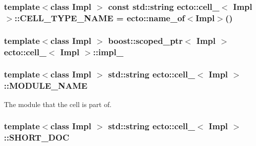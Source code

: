 \hypertarget{structecto_1_1cell___a26e158738e4e4c8f0ddb64efce30d8d3}{
\subsubsection[{C\-E\-L\-L\-\_\-\-T\-Y\-P\-E\-\_\-\-N\-A\-M\-E}]{\setlength{\rightskip}{0pt plus 5cm}template$<$class Impl $>$ const std\-::string {\bf ecto\-::cell\-\_\-}$<$ Impl $>$\-::C\-E\-L\-L\-\_\-\-T\-Y\-P\-E\-\_\-\-N\-A\-M\-E = {\bf ecto\-::name\-\_\-of}$<$Impl$>$()\hspace{0.3cm}{\ttfamily [static]}}}\label{structecto_1_1cell___a26e158738e4e4c8f0ddb64efce30d8d3}
\hypertarget{structecto_1_1cell___aefbb595c18abd0479e06a6f879dac961}{
\subsubsection[{impl\-\_\-}]{\setlength{\rightskip}{0pt plus 5cm}template$<$class Impl $>$ boost\-::scoped\-\_\-ptr$<$ Impl $>$ {\bf ecto\-::cell\-\_\-}$<$ Impl $>$\-::impl\-\_\-\hspace{0.3cm}{\ttfamily [private]}}}\label{structecto_1_1cell___aefbb595c18abd0479e06a6f879dac961}
\hypertarget{structecto_1_1cell___ab81cf6649132223f620b739a57db04db}{
\subsubsection[{M\-O\-D\-U\-L\-E\-\_\-\-N\-A\-M\-E}]{\setlength{\rightskip}{0pt plus 5cm}template$<$class Impl $>$ std\-::string {\bf ecto\-::cell\-\_\-}$<$ Impl $>$\-::M\-O\-D\-U\-L\-E\-\_\-\-N\-A\-M\-E\hspace{0.3cm}{\ttfamily [static]}}}\label{structecto_1_1cell___ab81cf6649132223f620b739a57db04db}


The module that the cell is part of. 

\hypertarget{structecto_1_1cell___a6a5b6bd083a48acd35ffcf83dacff2f1}{
\subsubsection[{S\-H\-O\-R\-T\-\_\-\-D\-O\-C}]{\setlength{\rightskip}{0pt plus 5cm}template$<$class Impl $>$ std\-::string {\bf ecto\-::cell\-\_\-}$<$ Impl $>$\-::S\-H\-O\-R\-T\-\_\-\-D\-O\-C\hspace{0.3cm}{\ttfamily [static]}}}\label{structecto_1_1cell___a6a5b6bd083a48acd35ffcf83dacff2f1}


